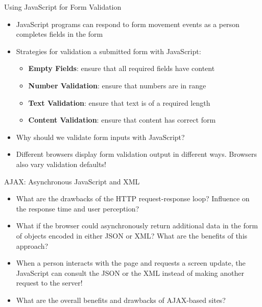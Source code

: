 \documentclass[14pt,aspectratio=169]{beamer}
\begin{document}
%
\begin{frame}{Using JavaScript for Form Validation}
  \begin{itemize}
    \item JavaScript programs can respond to form movement events as a person
      completes fields in the form
      \vspace*{-.15in}
    \item Strategies for validation a submitted form with JavaScript:
      \begin{itemize}
        \item {\bf Empty Fields}: ensure that all required fields have content
        \item {\bf Number Validation}: ensure that numbers are in range
        \item {\bf Text Validation}: ensure that text is of a required length
        \item {\bf Content Validation}: ensure that content has correct form
      \end{itemize}
      \vspace*{-.25in}
    \item Why should we validate form inputs with JavaScript?
      \vspace*{-.25in}
    \item Different browsers display form validation output in different ways.
      Browsers also vary validation defaults!
  \end{itemize}
\end{frame}

%
\begin{frame}{AJAX: Asynchronous JavaScript and XML}
  \begin{itemize}
    \item What are the drawbacks of the HTTP request-response loop? Influence on
      the response time and user perception?
      \vspace*{-.35in}
    \item What if the browser could asynchronously return additional data in the
      form of objects encoded in either JSON or XML? What are the benefits of
      this approach?
      \vspace*{-.15in}
    \item When a person interacts with the page and requests a screen update,
      the JavaScript can consult the JSON or the XML instead of making another
      request to the server!
      \vspace*{-.15in}
    \item What are the overall benefits and drawbacks of AJAX-based sites?
  \end{itemize}
\end{frame}
\end{document}
